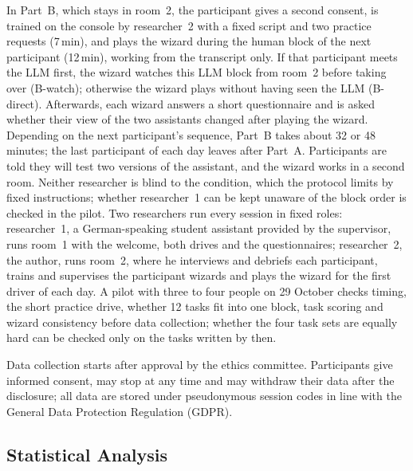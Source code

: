\documentclass[
    a4paper,
    11pt,
    DIV=11,
    bigheadings,
    idxtotoc,
    listof=totoc,
    bibtotoc,
    halfparskip,
    cleardoubleempty,
    openright,
    oneside
]{scrartcl}
\begin{document}
In Part~B, which stays in room~2, the participant gives a second consent, is trained on the console by researcher~2 with a fixed script and two practice requests (7\,min), and plays the wizard during the human block of the next participant (12\,min), working from the transcript only.
If that participant meets the LLM first, the wizard watches this LLM block from room~2 before taking over (B-watch); otherwise the wizard plays without having seen the LLM (B-direct).
Afterwards, each wizard answers a short questionnaire and is asked whether their view of the two assistants changed after playing the wizard.
Depending on the next participant's sequence, Part~B takes about 32 or 48 minutes; the last participant of each day leaves after Part~A.
Participants are told they will test two versions of the assistant, and the wizard works in a second room.
Neither researcher is blind to the condition, which the protocol limits by fixed instructions; whether researcher~1 can be kept unaware of the block order is checked in the pilot.
Two researchers run every session in fixed roles: researcher~1, a German-speaking student assistant provided by the supervisor, runs room~1 with the welcome, both drives and the questionnaires; researcher~2, the author, runs room~2, where he interviews and debriefs each participant, trains and supervises the participant wizards and plays the wizard for the first driver of each day.
A pilot with three to four people on 29 October checks timing, the short practice drive, whether 12 tasks fit into one block, task scoring and wizard consistency before data collection; whether the four task sets are equally hard can be checked only on the tasks written by then.

Data collection starts after approval by the ethics committee.
Participants give informed consent, may stop at any time and may withdraw their data after the disclosure; all data are stored under pseudonymous session codes in line with the General Data Protection Regulation (GDPR).

\subsection{Statistical Analysis}
\end{document}
